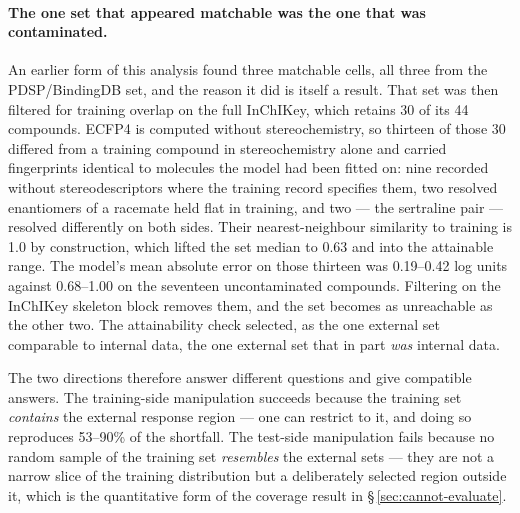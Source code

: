 \documentclass[11pt,a4paper]{article}
\begin{document}
\paragraph{The one set that appeared matchable was the one that was contaminated.}
An earlier form of this analysis found three matchable cells, all three from the
PDSP/BindingDB set, and the reason it did is itself a result. That set was then filtered
for training overlap on the full InChIKey, which retains 30 of its 44 compounds. ECFP4 is
computed without stereochemistry, so thirteen of those 30 differed from a training
compound in stereochemistry alone and carried fingerprints identical to molecules the
model had been fitted on: nine recorded without stereodescriptors where the training
record specifies them, two resolved enantiomers of a racemate held flat in training, and
two --- the sertraline pair --- resolved differently on both sides. Their
nearest-neighbour similarity to training is 1.0 by construction, which lifted the set
median to 0.63 and into the attainable range. The model's mean absolute error on those
thirteen was 0.19--0.42 log units against 0.68--1.00 on the seventeen uncontaminated
compounds. Filtering on the InChIKey skeleton block removes them, and the set becomes as
unreachable as the other two. The attainability check selected, as the one external set
comparable to internal data, the one external set that in part \emph{was} internal data.

The two directions therefore answer different questions and give compatible answers. The
training-side manipulation succeeds because the training set \emph{contains} the
external response region --- one can restrict to it, and doing so reproduces 53--90\% of
the shortfall. The test-side manipulation fails because no random sample of the training
set \emph{resembles} the external sets --- they are not a narrow slice of the training
distribution but a deliberately selected region outside it, which is the quantitative
form of the coverage result in \S\,\ref{sec:cannot-evaluate}.
\end{document}
